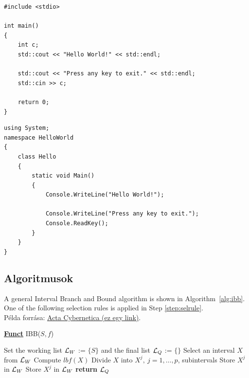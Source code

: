 \begin{listing}
\begin{verbatim}
#include <stdio>

int main() 
{
	int c;
	std::cout << "Hello World!" << std::endl;

	std::cout << "Press any key to exit." << std::endl;
	std::cin >> c;
	
	return 0;
}
\end{verbatim}
\caption{Hello World in C++}\label{src:cpp}
\end{listing}

\begin{listing}
\begin{verbatim}
using System;
namespace HelloWorld
{
	class Hello 
	{
		static void Main() 
		{
			Console.WriteLine("Hello World!");
			
			Console.WriteLine("Press any key to exit.");
			Console.ReadKey();
		}
	}
}
\end{verbatim}
\caption{Hello World in C\#}\label{src:csharp}
\end{listing}

\subsection{Algoritmusok} %

A general Interval Branch and Bound algorithm is shown in Algorithm~\ref{alg:ibb}. One of the following selection rules is applied in Step \ref{step:selrule}.\\
Példa forrása: \href{https://www.inf.u-szeged.hu/actacybernetica/}{Acta Cybernetica (ez egy link)}.

\begin{algorithm}[H]
\caption{A general interval B\&B algorithm} 
\label{alg:ibb} 
\textbf{\underline{Funct}} IBB($S,f$)
\begin{algorithmic}[1] %
\State Set the working list ${\cal L}_W$ := $\{S\}$ and the final list ${\cal L}_Q$ := $\{\}$     
 \label{alg:igoend}
	\State  Select an interval $X$ from ${\cal L}_W$ \label{step:selrule}  
	\State Compute $lbf(X)$ 		  
	 
		\State Divide $X$ into $X^j,\ j=1,\dots, p$, subintervals   
			 
				\State Store $X^j$ in ${\cal L}_W$ 
			\Else
				\State Store $X^j$ in ${\cal L}_W$ 
			\EndIf
		\EndFor  
	\EndIf
\EndWhile
\State \textbf{return} ${\cal L}_Q$
\end{algorithmic}
\end{algorithm}
